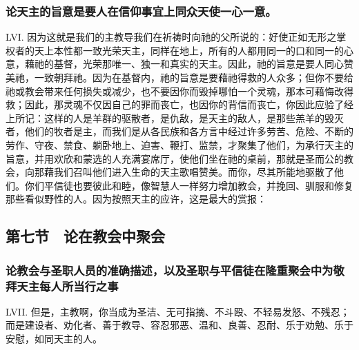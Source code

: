 
\subsubsection{论天主的旨意是要人在信仰事宜上同众天使一心一意。}

LVI. 因为这就是我们的主教导我们在祈祷时向祂的父所说的：好使正如无形之掌权者的天上本性都一致光荣天主，同样在地上，所有的人都用同一的口和同一的心意，藉祂的基督，光荣那唯一、独一和真实的天主。因此，祂的旨意是要人同心赞美祂，一致朝拜祂。因为在基督内，祂的旨意是要藉祂得救的人众多；但你不要给祂或教会带来任何损失或减少，也不要因你而毁掉哪怕一个灵魂，那本可藉悔改得救；因此，那灵魂不仅因自己的罪而丧亡，也因你的背信而丧亡，你因此应验了经上所记：这样的人是羊群的驱散者，是仇敌，是天主的敌人，是那些羔羊的毁灭者，他们的牧者是主，而我们是从各民族和各方言中经过许多劳苦、危险、不断的劳作、守夜、禁食、躺卧地上、迫害、鞭打、监禁，才聚集了他们，为承行天主的旨意，并用欢欣和蒙选的人充满宴席厅，使他们坐在祂的桌前，那就是圣而公的教会，向那藉我们召叫他们进入生命的天主歌唱赞美。而你，尽其所能地驱散了他们。你们平信徒也要彼此和睦，像智慧人一样努力增加教会，并挽回、驯服和修复那些看似野性的人。因为按照天主的应许，这是最大的赏报：\par


\subsection{第七节　论在教会中聚会}


\subsubsection{论教会与圣职人员的准确描述，以及圣职与平信徒在隆重聚会中为敬拜天主每人所当行之事}

LVII. 但是，主教啊，你当成为圣洁、无可指摘、不斗殴、不轻易发怒、不残忍；而是建设者、劝化者、善于教导、容忍邪恶、温和、良善、忍耐、乐于劝勉、乐于安慰，如同天主的人。\par

